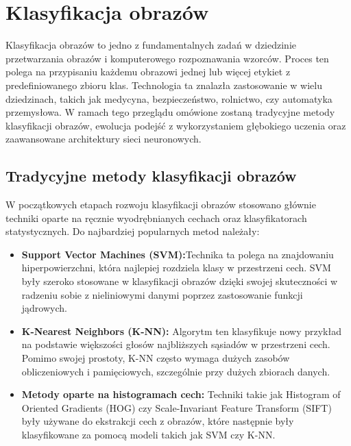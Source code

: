 \section*{Klasyfikacja obrazów}

Klasyfikacja obrazów to jedno z fundamentalnych zadań w dziedzinie przetwarzania obrazów i 
komputerowego rozpoznawania wzorców. Proces ten polega na przypisaniu każdemu obrazowi jednej 
lub więcej etykiet z predefiniowanego zbioru klas. Technologia ta znalazła zastosowanie w wielu 
dziedzinach, takich jak medycyna, bezpieczeństwo, rolnictwo, czy automatyka przemysłowa. W ramach 
tego przeglądu omówione zostaną tradycyjne metody klasyfikacji obrazów, ewolucja podejść z 
wykorzystaniem głębokiego uczenia oraz zaawansowane architektury sieci neuronowych. \cite{class_trad_deep} \cite{class_trad_deep2}

\subsection*{Tradycyjne metody klasyfikacji obrazów}

W początkowych etapach rozwoju klasyfikacji obrazów stosowano głównie techniki oparte
na ręcznie wyodrębnianych cechach oraz klasyfikatorach statystycznych. Do najbardziej
popularnych metod należały:

\begin{itemize}
    \item \textbf{Support Vector Machines (SVM):}\cite{svm_survey}Technika ta polega na znajdowaniu hiperpowierzchni, 
    która najlepiej rozdziela klasy w przestrzeni cech. SVM były szeroko stosowane w klasyfikacji 
    obrazów dzięki swojej skuteczności w radzeniu sobie z nieliniowymi danymi \cite{linear_nonlinear} poprzez zastosowanie 
    funkcji jądrowych. \cite{kernel}  
    \item \textbf{K-Nearest Neighbors (K-NN):} Algorytm ten klasyfikuje nowy przykład na podstawie 
    większości głosów najbliższych sąsiadów w przestrzeni cech. Pomimo swojej prostoty, K-NN często 
    wymaga dużych zasobów obliczeniowych i pamięciowych, szczególnie przy dużych zbiorach danych. \cite{knn}
    \item \textbf{Metody oparte na histogramach cech:} Techniki takie jak Histogram of Oriented 
    Gradients (HOG)\cite{hog} czy Scale-Invariant Feature Transform (SIFT) \cite{sift} były używane do ekstrakcji cech z 
    obrazów, które następnie były klasyfikowane za pomocą modeli takich jak SVM czy K-NN. \cite{svm_sift}
\end{itemize}

